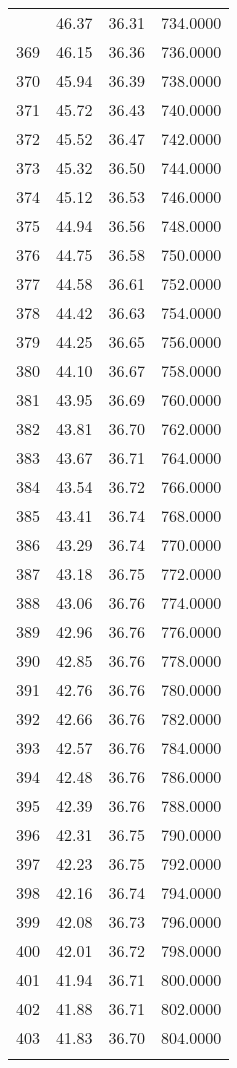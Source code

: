 \documentclass[
  captions=tableheading,
]{scrartcl}
\begin{document}
\begin{longtable} {l|l|l|l}
{368 &	46.37 &	36.31 &	734.0000\\
369 &	46.15 &	36.36 &	736.0000\\
370 &	45.94 &	36.39 &	738.0000\\
371 &	45.72 &	36.43 &	740.0000\\
372 &	45.52 &	36.47 &	742.0000\\
373 &	45.32 &	36.50 &	744.0000\\
374 &	45.12 &	36.53 &	746.0000\\
375 &	44.94 &	36.56 &	748.0000\\
376 &	44.75 &	36.58 &	750.0000\\
377 &	44.58 &	36.61 &	752.0000\\
378 &	44.42 &	36.63 &	754.0000\\
379 &	44.25 &	36.65 &	756.0000\\
380 &	44.10 &	36.67 &	758.0000\\
381 &	43.95 &	36.69 &	760.0000\\
382 &	43.81 &	36.70 &	762.0000\\
383 &	43.67 &	36.71 &	764.0000\\
384 &	43.54 &	36.72 &	766.0000\\
385 &	43.41 &	36.74 &	768.0000\\
386 &	43.29 &	36.74 &	770.0000\\
387 &	43.18 &	36.75 &	772.0000\\
388 &	43.06 &	36.76 &	774.0000\\
389 &	42.96 &	36.76 &	776.0000\\
390 &	42.85 &	36.76 &	778.0000\\
391 &	42.76 &	36.76 &	780.0000\\
392 &	42.66 &	36.76 &	782.0000\\
393 &	42.57 &	36.76 &	784.0000\\
394 &	42.48 &	36.76 &	786.0000\\
395 &	42.39 &	36.76 &	788.0000\\
396 &	42.31 &	36.75 &	790.0000\\
397 &	42.23 &	36.75 &	792.0000\\
398 &	42.16 &	36.74 &	794.0000\\
399 &	42.08 &	36.73 &	796.0000\\
400	& 42.01 &	36.72 &	798.0000\\
401	& 41.94 &	36.71 &	800.0000\\
402	& 41.88 &	36.71 &	802.0000\\
403	& 41.83 &	36.70 &	804.0000\\
}
\end{longtable}
\end{document}
